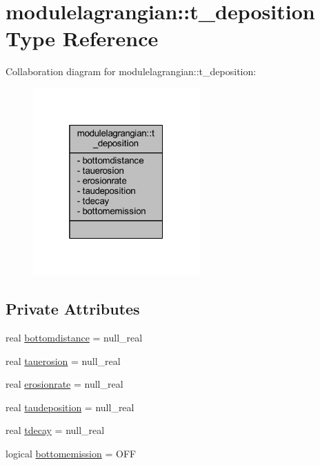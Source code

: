 \hypertarget{structmodulelagrangian_1_1t__deposition}{}\section{modulelagrangian\+:\+:t\+\_\+deposition Type Reference}
\label{structmodulelagrangian_1_1t__deposition}


Collaboration diagram for modulelagrangian\+:\+:t\+\_\+deposition\+:\nopagebreak
\begin{figure}[H]
\begin{center}
\leavevmode
\includegraphics[width=181pt]{structmodulelagrangian_1_1t__deposition__coll__graph}
\end{center}
\end{figure}
\subsection*{Private Attributes}
\begin{DoxyCompactItemize}
\item 
real \mbox{\hyperlink{structmodulelagrangian_1_1t__deposition_a5407aa51f14aedafae45d4e825f21f65}{bottomdistance}} = null\+\_\+real
\item 
real \mbox{\hyperlink{structmodulelagrangian_1_1t__deposition_ac82f4691325163f0d8a99975a4976616}{tauerosion}} = null\+\_\+real
\item 
real \mbox{\hyperlink{structmodulelagrangian_1_1t__deposition_a882a763884e110ce709752d08119569c}{erosionrate}} = null\+\_\+real
\item 
real \mbox{\hyperlink{structmodulelagrangian_1_1t__deposition_a6a3e3af971946ee6704cc6cf4025188d}{taudeposition}} = null\+\_\+real
\item 
real \mbox{\hyperlink{structmodulelagrangian_1_1t__deposition_ab64d9fc4813b825c60540390b6eea9ab}{tdecay}} = null\+\_\+real
\item 
logical \mbox{\hyperlink{structmodulelagrangian_1_1t__deposition_a47e6bf44620d09f90540783645322da7}{bottomemission}} = O\+FF
\end{DoxyCompactItemize}


